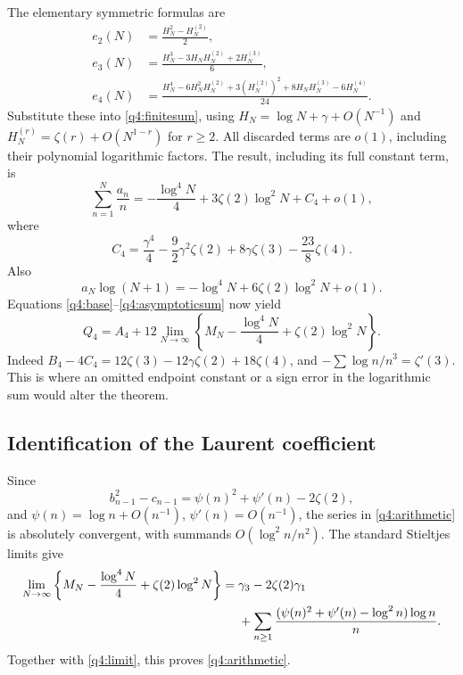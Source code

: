 The elementary symmetric formulas are
\[
 \begin{split}
 e_2(N)&=\frac{H_N^2-H_N^{(2)}}2,\\
 e_3(N)&=\frac{H_N^3-3H_NH_N^{(2)}+2H_N^{(3)}}6,\\
 e_4(N)&=\frac{H_N^4-6H_N^2H_N^{(2)}+3(H_N^{(2)})^2
                +8H_NH_N^{(3)}-6H_N^{(4)}}{24}.
 \end{split}
\]
Substitute these into \eqref{q4:finitesum}, using
$H_N=\log N+\gamma+O(N^{-1})$ and
$H_N^{(r)}=\zeta(r)+O(N^{1-r})$ for $r\geq2$.
All discarded terms are $o(1)$, including their polynomial logarithmic
factors.  The result, including its full constant term, is
\begin{equation}\label{q4:asymptoticsum}
 \sum_{n=1}^N\frac{a_n}{n}
 =-\frac{\log^4N}{4}+3\zeta(2)\log^2N+C_4+o(1),
\end{equation}
where
\begin{equation}\label{q4:C4}
 C_4=\frac{\gamma^4}{4}-\frac92\gamma^2\zeta(2)
                    +8\gamma\zeta(3)-\frac{23}8\zeta(4).
\end{equation}
Also
\[
 a_N\log(N+1)=-\log^4N+6\zeta(2)\log^2N+o(1).
\]
Equations \eqref{q4:base}--\eqref{q4:asymptoticsum} now yield
\begin{equation}\label{q4:limit}
 Q_4=A_4+12\lim_{N\to\infty}
       \left\{M_N-\frac{\log^4N}{4}+\zeta(2)\log^2N\right\}.
\end{equation}
Indeed $B_4-4C_4=12\zeta(3)-12\gamma\zeta(2)+18\zeta(4)$,
and $-\sum\log n/n^3=\zeta'(3)$.  This is where an omitted endpoint
constant or a sign error in the logarithmic sum would alter the theorem.

\subsection{Identification of the Laurent coefficient}

Since
\[
 b_{n-1}^2-c_{n-1}
   =\psi(n)^2+\psi'(n)-2\zeta(2),
\]
and $\psi(n)=\log n+O(n^{-1})$, $\psi'(n)=O(n^{-1})$, the series
in \eqref{q4:arithmetic} is absolutely convergent, with summands
$O(\log^2n/n^2)$.  The standard Stieltjes limits give
\begin{align}\label{q4:Mconstant}
 \lim_{N\to\infty}
       \left\{M_N-\frac{\log^4N}{4}+\zeta(2)\log^2N\right\}
  ={}&\gamma_3-2\zeta(2)\gamma_1\notag\\
 &+\sum_{n\geq1}
       \frac{(\psi(n)^2+\psi'(n)-\log^2n)\log n}{n}.
\end{align}
Together with \eqref{q4:limit}, this proves \eqref{q4:arithmetic}.

